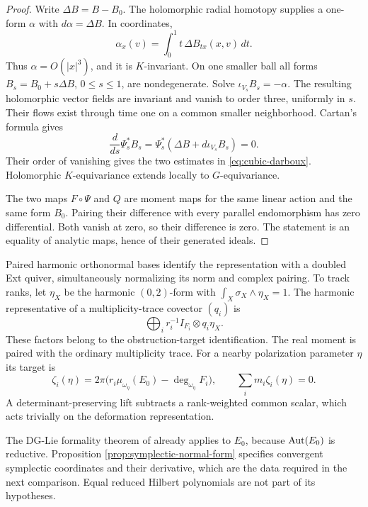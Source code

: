 \begin{proof}
Write $\Delta B=B-B_0$. The holomorphic radial homotopy supplies
a one-form $\alpha$ with $d\alpha=\Delta B$. In coordinates,
\[
 \alpha_x(v)=\int_0^1 t\,\Delta B_{tx}(x,v)\,dt.
\]
Thus $\alpha=O(|x|^3)$, and it is $K$-invariant. On one smaller
ball all forms $B_s=B_0+s\Delta B$, $0\le s\le1$, are
nondegenerate. Solve $\iota_{V_s}B_s=-\alpha$. The resulting
holomorphic vector fields are invariant and vanish to order three,
uniformly in $s$. Their flows exist through time one on a common
smaller neighborhood. Cartan's formula gives
\[
 \frac{d}{ds}\Psi_s^*B_s
   =\Psi_s^*(\Delta B+d\iota_{V_s}B_s)=0.
\]
Their order of vanishing gives the two estimates in
\eqref{eq:cubic-darboux}. Holomorphic $K$-equivariance extends
locally to $G$-equivariance.

The two maps $F\circ\Psi$ and $Q$ are moment maps for the same
linear action and the same form $B_0$. Pairing their difference
with every parallel endomorphism has zero differential. Both
vanish at zero, so their difference is zero. The statement is an
equality of analytic maps, hence of their generated ideals.
\end{proof}

Paired harmonic orthonormal bases identify the representation with
a doubled Ext quiver, simultaneously normalizing its norm and
complex pairing. To track ranks, let $\eta_X$ be the harmonic
$(0,2)$-form with $\int_X\sigma_X\wedge\eta_X=1$. The harmonic
representative of a multiplicity-trace covector $(q_i)$ is
\[
 \bigoplus_i r_i^{-1}I_{F_i}\otimes q_i\eta_X.
\]
These factors belong to the obstruction-target identification.
The real moment is paired with the ordinary multiplicity trace.
For a nearby polarization parameter $\eta$ its target is
\begin{equation}\label{eq:general-real-level}
 \zeta_i(\eta)=2\pi\bigl(r_i\mu_{\omega_\eta}(E_0)
                          -\deg_{\omega_\eta}F_i\bigr),
 \qquad \sum_i m_i\zeta_i(\eta)=0.
\end{equation}
A determinant-preserving lift subtracts a rank-weighted common
scalar, which acts trivially on the deformation representation.

The DG-Lie formality theorem of \cite[Theorem~5.1]{bmm} already
applies to $E_0$, because $\operatorname{Aut}(E_0)$ is reductive. Proposition
\ref{prop:symplectic-normal-form} specifies convergent symplectic
coordinates and their derivative, which are the data required in
the next comparison. Equal reduced Hilbert polynomials are not
part of its hypotheses.

